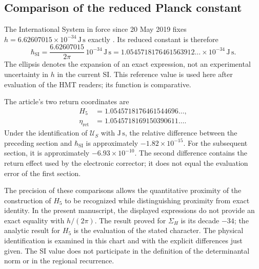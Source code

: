 \subsection{Comparison of the reduced Planck constant}
\label{sec:revision-planck-contraste}

The International System in force since 20 May 2019 fixes
\(h=6.62607015\times10^{-34}\,\mathrm{J\,s}\) exactly
\cite{bipm2018}. Its reduced constant is therefore
\[
 \hbar_{\mathrm{SI}}=\frac{6.62607015}{2\pi}\,10^{-34}\,\mathrm{J\,s}
 =1.0545718176461563912\ldots\times10^{-34}\,\mathrm{J\,s}.
\]
The ellipsis denotes the expansion of an exact expression,
not an experimental uncertainty in \(h\) in the current SI.
This reference value is used here after evaluation of the
HMT readers; its function is comparative.

The article's two return coordinates are
\begin{align*}
 H_5&=1.0545718176461544696\ldots,\\
 \eta_{\mathrm{ret}}&=1.0545718169150390611\ldots.
\end{align*}
Under the identification of \(\mathcal U_S\) with \(\mathrm{J\,s}\), the
relative difference between the preceding section and
\(\hbar_{\mathrm{SI}}\) is approximately \(-1.82\times10^{-15}\).
For the subsequent section, it is approximately \(-6.93\times10^{-10}\).
The second difference contains the return effect used by the
electronic corrector; it does not equal the evaluation error of the
first section.

The precision of these comparisons allows the quantitative proximity
of the construction of \(H_5\) to be recognized while distinguishing
proximity from exact identity. In the present manuscript, the displayed
expressions do not provide an exact equality with \(h/(2\pi)\).
The result proved for \(\Sigma_H\) is its decade \(-34\);
the analytic result for \(H_5\) is the evaluation of the stated
character. The physical identification is examined in this chart and with the
explicit differences just given. The SI value does not participate
in the definition of the determinantal norm or in the regional recurrence.

